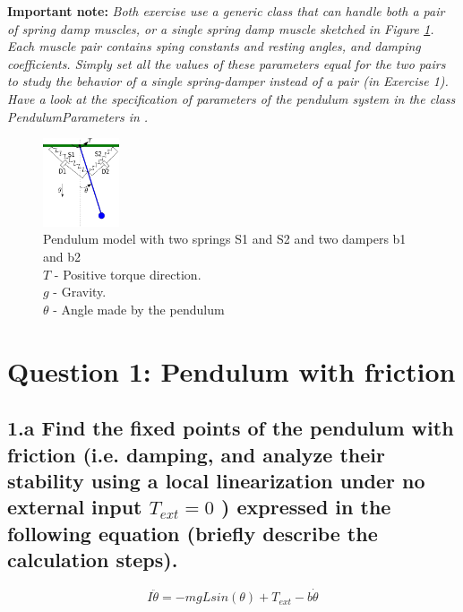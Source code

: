 \documentclass{cmc}
\begin{document}
\textbf{Important note:}
\textit{Both exercise use a generic class that can handle both a pair of
		spring damp muscles, or a single spring damp muscle sketched in Figure		
		\ref{fig:spring_mass_damper_sketch}. Each muscle pair
		contains sping constants and resting angles, and damping coefficients.
		Simply set all the values of these parameters equal for the two pairs
		to study the behavior of a single spring-damper instead of a pair (in Exercise 1).
		Have a look at the specification of parameters of the pendulum
		system in the class \textit{PendulumParameters} in .}


\begin{figure}[ht]
  \centering \includegraphics[width=0.2\textwidth]{figures/pendulum_spring_damper}
  \caption[pendulum with spring]{Pendulum model with two springs S1
    and S2 and two dampers b1 and b2\\
    $T$ - Positive torque direction.\\
    $g$ - Gravity.\\
    $\theta$ - Angle made by the pendulum
    \label{fig:spring_mass_damper_sketch} }
\end{figure}



\section*{Question 1: Pendulum with friction}

\subsection*{1.a Find the fixed points of the pendulum with friction
  (i.e. damping, and analyze their stability using a local linearization
  under no external input $T_{ext}=0$ ) expressed in the following equation
  (briefly describe the calculation steps). }


\begin{equation}
  \label{eq:ode-pendulum}
  I\ddot{\theta} = -mgLsin(\theta) + T_{ext} - b \dot{\theta}
\end{equation}
\end{document}

